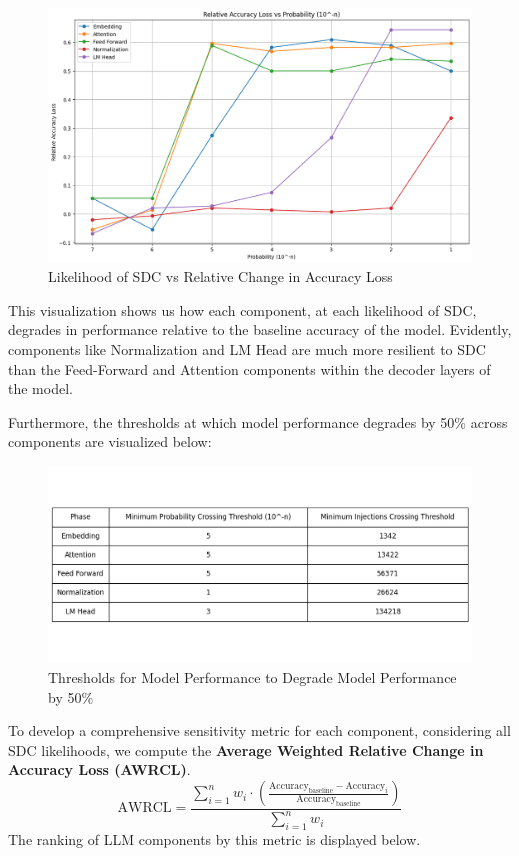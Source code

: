\begin{figure}[!htbp]
    \centering
    \includegraphics[width=1\linewidth]{images/rel_acc_loss.png}
    \caption{Likelihood of SDC vs Relative Change in Accuracy Loss}
    \label{fig:enter-label}
\end{figure}

This visualization shows us how each component, at each likelihood of SDC, degrades in performance relative to the baseline accuracy of the model. Evidently, components like Normalization and LM Head are much more resilient to SDC than the Feed-Forward and Attention components within the decoder layers of the model.

Furthermore, the thresholds at which model performance degrades by 50\% across components are visualized below:
\begin{figure}[!htbp]
    \centering
    \includegraphics[width=1\linewidth]{images/threshold.png}
    \caption{Thresholds for Model Performance to Degrade Model Performance by 50\%}
    \label{fig:enter-label}
\end{figure}

To develop a comprehensive sensitivity metric for each component, considering all SDC likelihoods, we compute the \textbf{Average Weighted Relative Change in Accuracy Loss (AWRCL)}. \[
\text{AWRCL} = \frac{\sum_{i=1}^{n} w_i \cdot \left( \frac{\text{Accuracy}_{\text{baseline}} - \text{Accuracy}_{i}}{\text{Accuracy}_{\text{baseline}}} \right)}{\sum_{i=1}^{n} w_i}
\]
The ranking of LLM components by this metric is displayed below.

